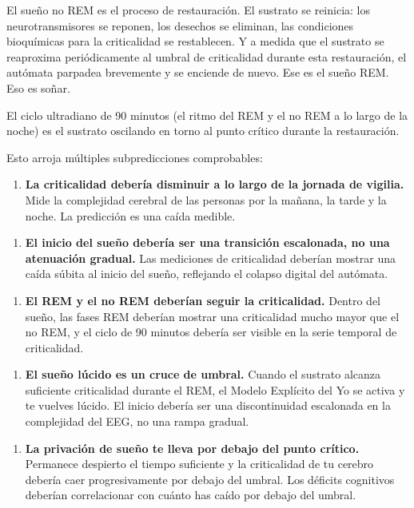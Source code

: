 \documentclass[11pt, twoside, openright]{book}
\begin{document}
El sueño no REM es el proceso de restauración. El sustrato se reinicia: los neurotransmisores se reponen, los desechos se eliminan, las condiciones bioquímicas para la criticalidad se restablecen. Y a medida que el sustrato se reaproxima periódicamente al umbral de criticalidad durante esta restauración, el autómata parpadea brevemente y se enciende de nuevo. Ese es el sueño REM. Eso es soñar.

El ciclo ultradiano de 90 minutos (el ritmo del REM y el no REM a lo largo de la noche) es el sustrato oscilando en torno al punto crítico durante la restauración.

Esto arroja múltiples subpredicciones comprobables:

\begin{enumerate}
  \item \textbf{La criticalidad debería disminuir a lo largo de la jornada de vigilia.} Mide la complejidad cerebral de las personas por la mañana, la tarde y la noche. La predicción es una caída medible.
\end{enumerate}

\begin{enumerate}
  \item \textbf{El inicio del sueño debería ser una transición escalonada, no una atenuación gradual.} Las mediciones de criticalidad deberían mostrar una caída súbita al inicio del sueño, reflejando el colapso digital del autómata.
\end{enumerate}

\begin{enumerate}
  \item \textbf{El REM y el no REM deberían seguir la criticalidad.} Dentro del sueño, las fases REM deberían mostrar una criticalidad mucho mayor que el no REM, y el ciclo de 90 minutos debería ser visible en la serie temporal de criticalidad.
\end{enumerate}

\begin{enumerate}
  \item \textbf{El sueño lúcido es un cruce de umbral.} Cuando el sustrato alcanza suficiente criticalidad durante el REM, el Modelo Explícito del Yo se activa y te vuelves lúcido. El inicio debería ser una discontinuidad escalonada en la complejidad del EEG, no una rampa gradual.
\end{enumerate}

\begin{enumerate}
  \item \textbf{La privación de sueño te lleva por debajo del punto crítico.} Permanece despierto el tiempo suficiente y la criticalidad de tu cerebro debería caer progresivamente por debajo del umbral. Los déficits cognitivos deberían correlacionar con cuánto has caído por debajo del umbral.
\end{enumerate}
\end{document}
